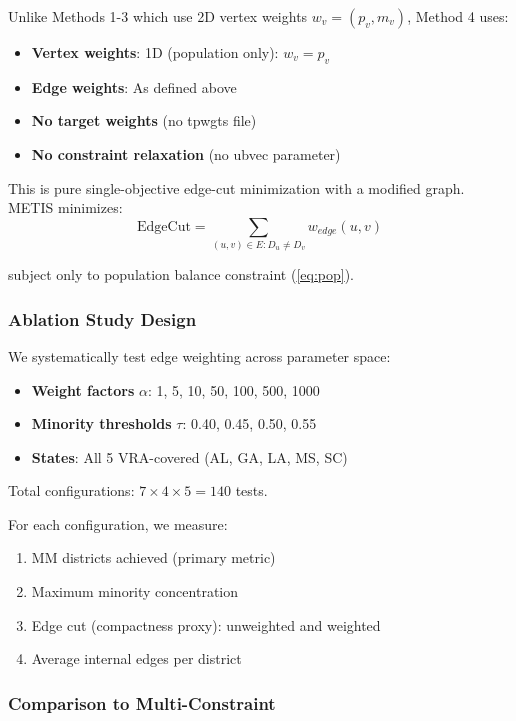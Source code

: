 Unlike Methods 1-3 which use 2D vertex weights $w_v = (p_v, m_v)$, Method 4 uses:
\begin{itemize}
\item \textbf{Vertex weights}: 1D (population only): $w_v = p_v$
\item \textbf{Edge weights}: As defined above
\item \textbf{No target weights} (no tpwgts file)
\item \textbf{No constraint relaxation} (no ubvec parameter)
\end{itemize}

This is pure single-objective edge-cut minimization with a modified graph. METIS minimizes:
\begin{equation}
\text{EdgeCut} = \sum_{(u,v) \in E : D_u \neq D_v} w_{edge}(u, v)
\end{equation}

subject only to population balance constraint (\ref{eq:pop}).

\subsubsection{Ablation Study Design}

We systematically test edge weighting across parameter space:
\begin{itemize}
\item \textbf{Weight factors} $\alpha$: 1, 5, 10, 50, 100, 500, 1000
\item \textbf{Minority thresholds} $\tau$: 0.40, 0.45, 0.50, 0.55
\item \textbf{States}: All 5 VRA-covered (AL, GA, LA, MS, SC)
\end{itemize}

Total configurations: $7 \times 4 \times 5 = 140$ tests.

For each configuration, we measure:
\begin{enumerate}
\item MM districts achieved (primary metric)
\item Maximum minority concentration
\item Edge cut (compactness proxy): unweighted and weighted
\item Average internal edges per district
\end{enumerate}

\subsubsection{Comparison to Multi-Constraint}

